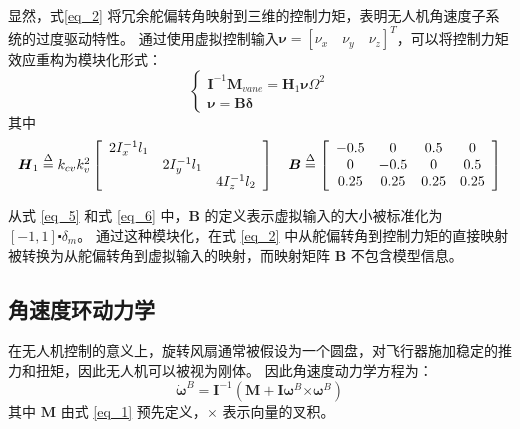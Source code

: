 显然，式\eqref{eq_2} 将冗余舵偏转角映射到三维的控制力矩，表明无人机角速度子系统的过度驱动特性。 通过使用虚拟控制输入$ \boldsymbol{\nu }=[{\nu }_{x} \quad {\nu }_{y} \quad {\nu }_{z}]^{T}$，可以将控制力矩效应重构为模块化形式：
\begin{equation}
	\left\{ \begin{array}{l}
	{{\boldsymbol{I}}^{ - 1}}{{\boldsymbol{M}}_{vane}} = {{\boldsymbol{H}}_1}{\boldsymbol{\nu }}{\Omega ^2}\\
	{\boldsymbol{\nu }} = {\boldsymbol{B\delta }}
	\end{array} \right.
	\label{eq_5}
	\end{equation}
其中
	\begin{equation}
	\begin{array}{ccccc}
	{{\boldsymbol{H}}_1} \buildrel \Delta \over =   {k_{cv}}k_v^2\left[ {\begin{array}{*{20}{c}}
		{2I_x^{ - 1}{l_1}}&{}&{}\\
		{}&{2I_y^{ - 1}{l_1}}&{}\\
		{}&{}&{4I_z^{ - 1}{l_2}}
		\end{array}} \right]     \quad
	{\boldsymbol{B}} \buildrel \Delta \over =   \left[ {\begin{array}{*{20}{c}}
		{ - 0.5}&0&{0.5}&0\\
		0&{ - 0.5}&0&{0.5}\\
		{0.25}&{0.25}&{0.25}&{0.25}
		\end{array}} \right]
	\end{array}
	\label{eq_6}
\end{equation}

从式 \eqref{eq_5} 和式 \eqref{eq_6} 中，$\boldsymbol{B}$ 的定义表示虚拟输入的大小被标准化为 $[-1,1] \centerdot {{\delta }_{m }}$。 通过这种模块化，在式 \eqref{eq_2} 中从舵偏转角到控制力矩的直接映射被转换为从舵偏转角到虚拟输入的映射，而映射矩阵 $\boldsymbol{B}$ 不包含模型信息。


\subsection{角速度环动力学}
在无人机控制的意义上，旋转风扇通常被假设为一个圆盘，对飞行器施加稳定的推力和扭矩，因此无人机可以被视为刚体。 因此角速度动力学方程为：
\begin{equation}
	{{\boldsymbol{\dot \omega }}^B} = {{\boldsymbol{I}}^{ - 1}}\left( {{\boldsymbol{M + I}}{{\boldsymbol{\omega }}^B}{\boldsymbol{ \times }}{{\boldsymbol{\omega }}^B}} \right)
	\label{eq_16}
\end{equation}
其中 $\boldsymbol M$ 由式 \eqref{eq_1} 预先定义，$\times$ 表示向量的叉积。

